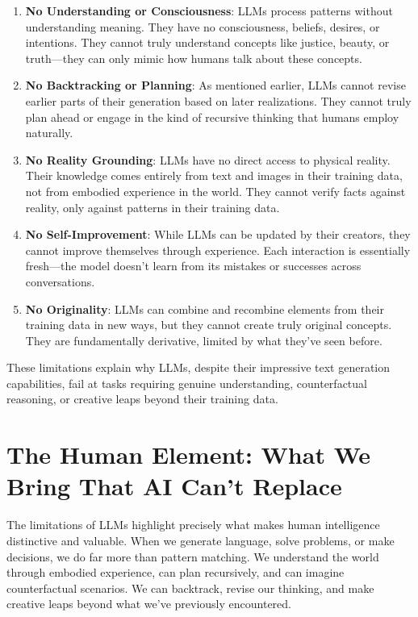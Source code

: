 \documentclass[
  Letterpaper,
]{scrbook}
\begin{document}
\begin{enumerate}
\def\labelenumi{\arabic{enumi}.}
\item
  \textbf{No Understanding or Consciousness}: LLMs process patterns
  without understanding meaning. They have no consciousness, beliefs,
  desires, or intentions. They cannot truly understand concepts like
  justice, beauty, or truth---they can only mimic how humans talk about
  these concepts.
\item
  \textbf{No Backtracking or Planning}: As mentioned earlier, LLMs
  cannot revise earlier parts of their generation based on later
  realizations. They cannot truly plan ahead or engage in the kind of
  recursive thinking that humans employ naturally.
\item
  \textbf{No Reality Grounding}: LLMs have no direct access to physical
  reality. Their knowledge comes entirely from text and images in their
  training data, not from embodied experience in the world. They cannot
  verify facts against reality, only against patterns in their training
  data.
\item
  \textbf{No Self-Improvement}: While LLMs can be updated by their
  creators, they cannot improve themselves through experience. Each
  interaction is essentially fresh---the model doesn't learn from its
  mistakes or successes across conversations.
\item
  \textbf{No Originality}: LLMs can combine and recombine elements from
  their training data in new ways, but they cannot create truly original
  concepts. They are fundamentally derivative, limited by what they've
  seen before.
\end{enumerate}

These limitations explain why LLMs, despite their impressive text
generation capabilities, fail at tasks requiring genuine understanding,
counterfactual reasoning, or creative leaps beyond their training data.

\section{The Human Element: What We Bring That AI Can't
Replace}\label{the-human-element-what-we-bring-that-ai-cant-replace}

The limitations of LLMs highlight precisely what makes human
intelligence distinctive and valuable. When we generate language, solve
problems, or make decisions, we do far more than pattern matching. We
understand the world through embodied experience, can plan recursively,
and can imagine counterfactual scenarios. We can backtrack, revise our
thinking, and make creative leaps beyond what we've previously
encountered.
\end{document}
